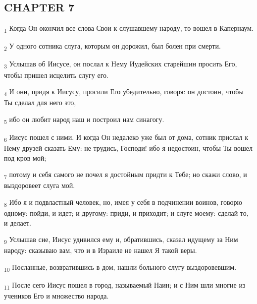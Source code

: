 \subsection{CHAPTER 7}
\begin{tcolorbox}
\textsubscript{1} Когда Он окончил все слова Свои к слушавшему народу, то вошел в Капернаум.
\end{tcolorbox}
\begin{tcolorbox}
\textsubscript{2} У одного сотника слуга, которым он дорожил, был болен при смерти.
\end{tcolorbox}
\begin{tcolorbox}
\textsubscript{3} Услышав об Иисусе, он послал к Нему Иудейских старейшин просить Его, чтобы пришел исцелить слугу его.
\end{tcolorbox}
\begin{tcolorbox}
\textsubscript{4} И они, придя к Иисусу, просили Его убедительно, говоря: он достоин, чтобы Ты сделал для него это,
\end{tcolorbox}
\begin{tcolorbox}
\textsubscript{5} ибо он любит народ наш и построил нам синагогу.
\end{tcolorbox}
\begin{tcolorbox}
\textsubscript{6} Иисус пошел с ними. И когда Он недалеко уже был от дома, сотник прислал к Нему друзей сказать Ему: не трудись, Господи! ибо я недостоин, чтобы Ты вошел под кров мой;
\end{tcolorbox}
\begin{tcolorbox}
\textsubscript{7} потому и себя самого не почел я достойным придти к Тебе; но скажи слово, и выздоровеет слуга мой.
\end{tcolorbox}
\begin{tcolorbox}
\textsubscript{8} Ибо я и подвластный человек, но, имея у себя в подчинении воинов, говорю одному: пойди, и идет; и другому: приди, и приходит; и слуге моему: сделай то, и делает.
\end{tcolorbox}
\begin{tcolorbox}
\textsubscript{9} Услышав сие, Иисус удивился ему и, обратившись, сказал идущему за Ним народу: сказываю вам, что и в Израиле не нашел Я такой веры.
\end{tcolorbox}
\begin{tcolorbox}
\textsubscript{10} Посланные, возвратившись в дом, нашли больного слугу выздоровевшим.
\end{tcolorbox}
\begin{tcolorbox}
\textsubscript{11} После сего Иисус пошел в город, называемый Наин; и с Ним шли многие из учеников Его и множество народа.
\end{tcolorbox}
